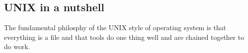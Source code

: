 \chapter[Introduction]{}

\section{UNIX in a nutshell}

The fundamental philosphy of the UNIX style of operating system is that
everything is a file and that tools do one thing well and are chained
together to do work.



